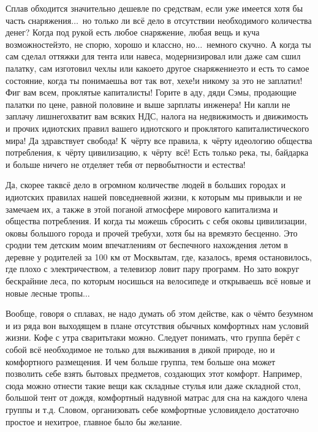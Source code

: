 Сплав обходится значительно дешевле по средствам, если уже имеется хотя бы часть снаряжения$\ldots$~но только ли всё дело в отсутствии необходимого количества денег? Когда под рукой есть любое снаряжение, любая вещь и куча возможностей\mdash это, не спорю, хорошо и классно, но$\ldots$~немного скучно. А когда ты сам сделал оттяжки для тента или навеса, модернизировал или даже сам сшил палатку, сам изготовил чехлы или какое\sdash то другое снаряжение\mdash это и есть то самое состояние, когда ты понимаешь\mdash а вот так вот, хе\sdash хе!\mdash и никому за это не заплатил! Фиг вам всем, проклятые капиталисты! Горите в аду, дяди Сэмы, продающие палатки по цене, равной половине и выше зарплаты инженера!  Ни капли не заплачу лишнего\mdash хватит вам всяких НДС, налога на недвижимость и движимость и прочих идиотских правил вашего идиотского и проклятого капиталистического мира! Да здравствует свобода! К~чёрту все правила, к~чёрту идеологию общества потребления, к~чёрту цивилизацию, к~чёрту~всё! Есть только река, ты, байдарка и больше ничего не отделяет тебя от первобытности и естества! 

Да, скорее так\mdash всё дело в огромном количестве людей в больших городах и идиотских правилах нашей повседневной жизни, к которым мы привыкли и не замечаем их, а также в этой поганой атмосфере мирового капитализма и общества потребления. И когда ты можешь сбросить с себя оковы цивилизации, оковы большого города и прочей требухи, хотя бы на время\mdash это бесценно. Это сродни тем детским моим впечатлениям от беспечного нахождения летом в деревне у родителей за 100 км от Москвы\mdash там, где, казалось, время остановилось, где плохо с электричеством, а телевизор ловит пару программ. Но зато вокруг бескрайние леса, по которым носишься на велосипеде и открываешь всё новые и новые лесные тропы$\ldots$ 

Вообще, говоря о сплавах, не надо думать об этом действе, как о чём\sdash то безумном и из ряда вон выходящем в плане отсутствия обычных комфортных нам условий жизни. Кофе с утра сварить\sdash таки можно. Следует понимать, что группа берёт с собой всё необходимое не только для выживания в дикой природе, но и комфортного размещения. И чем больше группа, тем больше она может позволить себе взять бытовых предметов, создающих этот комфорт. Например, сюда можно отнести такие вещи как складные стулья или даже складной стол, большой тент от дождя, комфортный надувной матрас для сна на каждого члена группы и т.д. Словом, организовать себе комфортные условия\mdash дело достаточно простое и нехитрое, главное было бы желание. 

